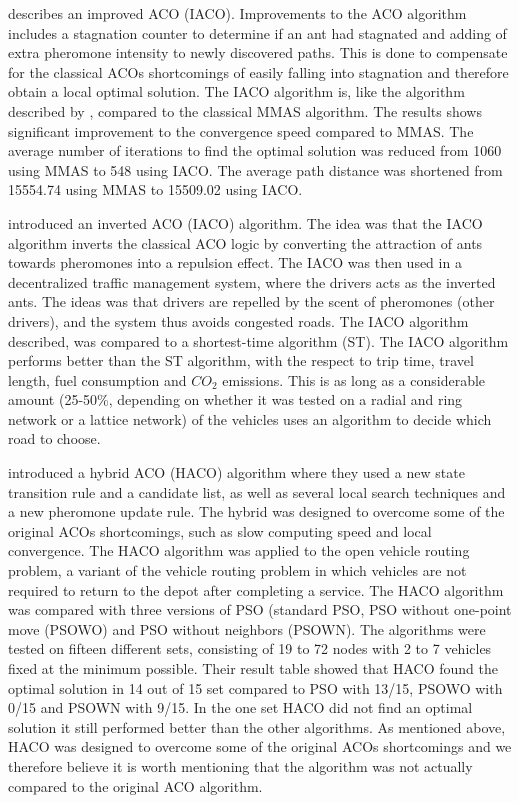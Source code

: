\par
\citet{jiang10} describes an improved ACO (IACO). Improvements to the ACO algorithm includes a stagnation counter to determine if an ant had stagnated and adding of extra pheromone intensity to newly discovered paths. This is done to compensate for the classical ACOs shortcomings of easily falling into stagnation and therefore obtain a local optimal solution. The IACO algorithm is, like the algorithm described by \citet{yang07}, compared to the classical MMAS algorithm. The results shows significant improvement to the convergence speed compared to MMAS. The average number of iterations to find the optimal solution was reduced from 1060 using MMAS to 548 using IACO. The average path distance was shortened from 15554.74 using MMAS to 15509.02 using IACO. 
\par
\citet{dias14} introduced an inverted ACO (IACO) algorithm. The idea was that the IACO algorithm inverts the classical ACO logic by converting the attraction of ants towards pheromones into a repulsion effect. The IACO was then used in a decentralized traffic management system, where the drivers acts as the inverted ants. The ideas was that drivers are repelled by the scent of pheromones (other drivers), and the system thus avoids congested roads. The IACO algorithm described, was compared to a shortest-time algorithm (ST). The IACO algorithm performs better than the ST algorithm, with the respect to trip time, travel length, fuel consumption and $CO_2$ emissions. This is as long as a considerable amount (25-50\%, depending on whether it was tested on a radial and ring network or a lattice network) of the vehicles uses an algorithm to decide which road to choose. 
\par
\citet{sedighpour14} introduced a hybrid ACO (HACO) algorithm where they used a new state transition rule and a candidate list, as well as several local search techniques and a new pheromone update rule. The hybrid was designed to overcome some of the original ACOs shortcomings, such as slow computing speed and local convergence. The HACO algorithm was applied to the open vehicle routing problem, a variant of the vehicle routing problem in which vehicles are not required to return to the depot after completing a service. The HACO algorithm was compared with three versions of PSO (standard PSO, PSO without one-point move (PSOWO) and PSO without neighbors (PSOWN). The algorithms were tested on fifteen different sets, consisting of 19 to 72 nodes with 2 to 7 vehicles fixed at the minimum possible. Their result table showed that HACO found the optimal solution in 14 out of 15 set compared to PSO with 13/15, PSOWO with 0/15 and PSOWN with 9/15. In the one set HACO did not find an optimal solution it still performed better than the other algorithms. As mentioned above, HACO was designed to overcome some of the original ACOs shortcomings and we therefore believe it is worth mentioning that the algorithm was not actually compared to the original ACO algorithm. 

